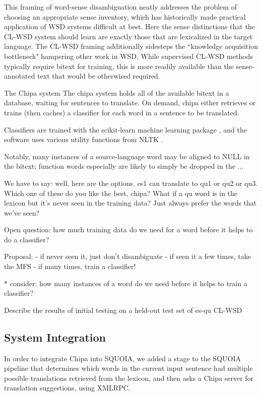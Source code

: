 \documentclass[10pt, a4paper]{article}
\begin{document}
This framing of word-sense disambiguation neatly addresses the problem of
choosing an appropriate sense inventory, which has historically made practical
application of WSD systems difficult at best.
Here the sense distinctions that the CL-WSD system should learn are exactly
those that are lexicalized in the target language.
The CL-WSD framing additionally sidesteps the ``knowledge
acquisition bottleneck" \cite{agirre2006word}
hampering other work in WSD. While supervised CL-WSD methods typically require
bitext for training, this is more readily available than the sense-annotated
text that would be otherwised required.

The Chipa system 
The chipa system holds all of the available bitext in a database, waiting for
sentences to translate.
On demand, chipa either retrieves or trains (then caches) a classifier
for each word in a sentence to be translated.

Classifiers are trained with the scikit-learn machine learning package
\cite{scikit-learn}, and the software uses various utility functions from NLTK
\cite{nltkbook}.


Notably, many instances of a source-language word may be aligned to NULL in the
bitext; function words especially are likely to simply be dropped in the ...


We have to say: well, here are the options. es1 can translate to qu1 or qu2 or
qu3. Which one of these do you like the best, chipa?
What if a qu word is in the lexicon but it's never seen in the training data?
Just always prefer the words that we've seen?


Open question: how much training data do we need for a word before it helps to
do a classifier?

Proposal:
- if never seen it, just don't disambiguate
- if seen it a few times, take the MFS
- if many times, train a classifier!


* consider: how many instances of a word do we need before it helps to train a
classifier?

Describe the results of initial testing on a held-out test set of es-qu CL-WSD



\subsection{System Integration}
In order to integrate Chipa into SQUOIA, we added a stage to the SQUOIA
pipeline that determines which words in the current input sentence had multiple
possible translations retrieved from the lexicon, and then asks a Chipa
server for translation suggestions, using XMLRPC.
\end{document}
